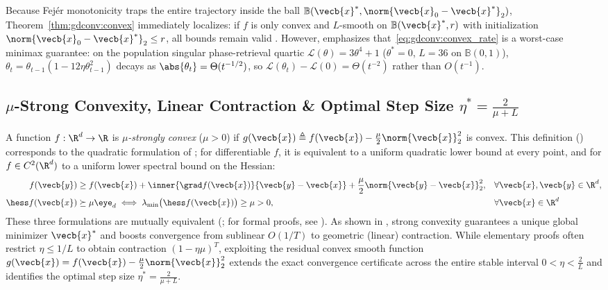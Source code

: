 \documentclass[../../../../master.tex]{subfiles}
\begin{document}
Because Fej\'er monotonicity traps the entire trajectory inside the ball $\mathbb{B}(\vecb{x}^*, \norm{\vecb{x}_0-\vecb{x}^*}_2)$, Theorem~\ref{thm:gdconv:convex} immediately localizes: if $f$ is only convex and $L$-smooth on $\mathbb{B}(\vecb{x}^*, r)$ with initialization $\norm{\vecb{x}_0-\vecb{x}^*}_2 \le r$, all bounds remain valid . However,  emphasizes that~\eqref{eq:gdconv:convex_rate} is a worst-case minimax guarantee: on the population singular phase-retrieval quartic $\mathcal{L}(\theta) = 3\theta^4 + 1$ ($\theta^*=0$, $L=36$ on $\mathbb{B}(0,1)$), $\theta_t = \theta_{t-1}(1 - 12\eta\theta_{t-1}^2)$ decays as $\abs{\theta_t} = \Theta(t^{-1/2})$, so $\mathcal{L}(\theta_t) - \mathcal{L}(0) = \Theta(t^{-2})$ rather than $O(t^{-1})$.

\subsection{\texorpdfstring{$\mu$}{mu}-Strong Convexity, Linear Contraction \& Optimal Step Size \texorpdfstring{$\eta^* = \frac{2}{\mu+L}$}{eta* = 2/(mu+L)}}
\label{subsec:gdconv:strong_convex}

A function $f : \R^d \to \R$ is \emph{$\mu$-strongly convex} ($\mu > 0$) if $g(\vecb{x}) \triangleq f(\vecb{x}) - \frac{\mu}{2}\norm{\vecb{x}}_2^2$ is convex. This definition () corresponds to the quadratic formulation of ; for differentiable $f$, it is equivalent to a uniform quadratic lower bound at every point, and for $f \in C^2(\R^d)$ to a uniform lower spectral bound on the Hessian:
\begin{align}
  f(\vecb{y}) &\ge f(\vecb{x}) + \inner{\grad f(\vecb{x})}{\vecb{y}-\vecb{x}} + \frac{\mu}{2}\norm{\vecb{y}-\vecb{x}}_2^2, && \forall \vecb{x}, \vecb{y} \in \R^d, \label{eq:gdconv:sc_quad} \\
  \hess f(\vecb{x}) &\succeq \mu \eye_d \iff \lambda_{\min}\big(\hess f(\vecb{x})\big) \ge \mu > 0, && \forall \vecb{x} \in \R^d \label{eq:gdconv:sc_hess}
\end{align}
These three formulations are mutually equivalent (; for formal proofs, see ). As shown in , strong convexity guarantees a unique global minimizer $\vecb{x}^*$ and boosts convergence from sublinear $O(1/T)$ to geometric (linear) contraction. While elementary proofs often restrict $\eta \le 1/L$ to obtain contraction $(1 - \eta\mu)^T$, exploiting the residual convex smooth function $g(\vecb{x}) = f(\vecb{x}) - \frac{\mu}{2}\norm{\vecb{x}}_2^2$ extends the exact convergence certificate across the entire stable interval $0 < \eta < \frac{2}{L}$ and identifies the optimal step size $\eta^* = \frac{2}{\mu+L}$.
\end{document}
